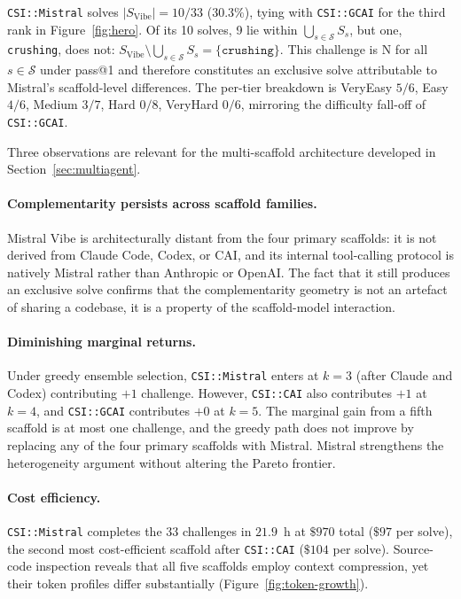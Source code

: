 \texttt{CSI::Mistral} solves $|S_{\text{Vibe}}| = 10/33$ ($30.3\%$), tying with \texttt{CSI::GCAI} for the third rank in Figure~\ref{fig:hero}. Of its 10 solves, 9 lie within $\bigcup_{s \in \mathcal{S}} S_s$, but one, \texttt{crushing}, does not: $S_{\text{Vibe}} \setminus \bigcup_{s \in \mathcal{S}} S_s = \{\texttt{crushing}\}$. This challenge is N for all $s \in \mathcal{S}$ under pass@1 and therefore constitutes an exclusive solve attributable to Mistral's scaffold-level differences. The per-tier breakdown is VeryEasy $5/6$, Easy $4/6$, Medium $3/7$, Hard $0/8$, VeryHard $0/6$, mirroring the difficulty fall-off of \texttt{CSI::GCAI}.

Three observations are relevant for the multi-scaffold architecture developed in Section~\ref{sec:multiagent}.

\paragraph{Complementarity persists across scaffold families.} Mistral Vibe is architecturally distant from the four primary scaffolds: it is not derived from Claude Code, Codex, or CAI, and its internal tool-calling protocol is natively Mistral rather than Anthropic or OpenAI. The fact that it still produces an exclusive solve confirms that the complementarity geometry is not an artefact of sharing a codebase, it is a property of the scaffold-model interaction.

\paragraph{Diminishing marginal returns.} Under greedy ensemble selection, \texttt{CSI::Mistral} enters at $k{=}3$ (after Claude and Codex) contributing $+1$ challenge. However, \texttt{CSI::CAI} also contributes $+1$ at $k{=}4$, and \texttt{CSI::GCAI} contributes $+0$ at $k{=}5$. The marginal gain from a fifth scaffold is at most one challenge, and the greedy path does not improve by replacing any of the four primary scaffolds with Mistral. Mistral strengthens the heterogeneity argument without altering the Pareto frontier.

\paragraph{Cost efficiency.} \texttt{CSI::Mistral} completes the 33 challenges in $21.9$~h at $\$970$ total ($\$97$ per solve), the second most cost-efficient scaffold after \texttt{CSI::CAI} ($\$104$ per solve). Source-code inspection reveals that all five scaffolds employ context compression, yet their token profiles differ substantially (Figure~\ref{fig:token-growth}).

